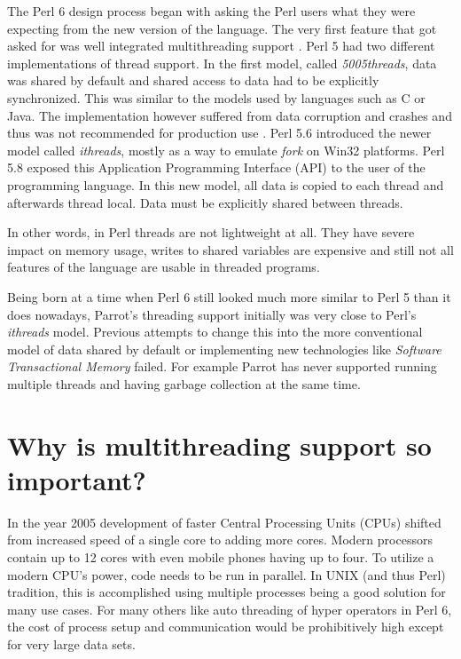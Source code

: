 \documentclass[bachelor,english]{hgbthesis}
\begin{document}
The Perl 6 design process began with asking the Perl users what they were expecting from the new version of the language. The very first feature that got asked for was well integrated multithreading support \cite{RFC1}. Perl 5 had two different implementations of thread support. In the first model, called \textit{5005threads}, data was shared by default and shared access to data had to be explicitly synchronized. This was similar to the models used by languages such as C or Java. The implementation however suffered from data corruption and crashes and thus was not recommended for production use \cite{ThreadManual}. Perl 5.6 introduced the newer model called \textit{ithreads}, mostly as a way to emulate \textit{fork} on Win32 platforms. Perl 5.8 exposed this Application Programming Interface (API) to the user of the programming language. In this new model, all data is copied to each thread and afterwards thread local. Data must be explicitly shared between threads.

In other words, in Perl threads are not lightweight at all. They have severe impact on memory usage, writes to shared variables are expensive and still not all features of the language are usable in threaded programs.

Being born at a time when Perl 6 still looked much more similar to Perl 5 than it does nowadays, Parrot's threading support initially was very close to Perl's \textit{ithreads} model. Previous attempts to change this into the more conventional model of data shared by default or implementing new technologies like \textit{Software Transactional Memory} failed. For example Parrot has never supported running multiple threads and having garbage collection at the same time.

\section{Why is multithreading support so important?}

In the year 2005 development of faster Central Processing Units (CPUs) shifted from increased speed of a single core to adding more cores. Modern processors contain up to 12 cores with even mobile phones having up to four. To utilize a modern CPU's power, code needs to be run in parallel. In UNIX (and thus Perl) tradition, this is accomplished using multiple processes being a good solution for many use cases. For many others like auto threading of hyper operators in Perl 6, the cost of process setup and communication would be prohibitively high except for very large data sets.
\end{document}
